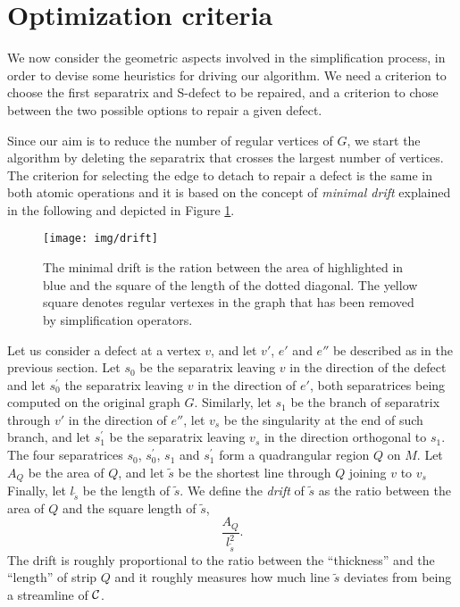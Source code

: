 \documentclass[11pt,a4paper]{article}
\begin{document}
\section{Optimization criteria}
\label{sec:optimize}
We now consider the geometric aspects involved in the simplification process, in order to devise some heuristics for driving our algorithm.
We need a criterion to choose the first separatrix and S-defect to be repaired, and a criterion to chose between the two possible options to repair a given defect.

Since our aim is to reduce the number of regular vertices of $G$, we start the algorithm by deleting the separatrix that crosses the largest number of vertices. 
The criterion for selecting the edge to detach to repair a defect is the same in both atomic operations and it is based on the concept of \emph{minimal drift} explained in the following and depicted in Figure \ref{fig:drift}. 

\begin{figure}
\centering
\mbox{}
\hfill
\centerline{\texttt{[image: img/drift]}}


\hfill\mbox{}
\caption{\label{fig:drift} The minimal drift is the ration between the area of highlighted in blue and the square of the length of the dotted diagonal. The yellow square denotes regular vertexes in the graph that has been removed by simplification operators.
}
\end{figure}


Let us consider a defect at a vertex $v$, and let $v'$, $e'$ and $e''$ be described as in the previous section.
Let $s_0$ be the separatrix leaving $v$ in the direction of the defect and let $s_0^{\prime}$ the separatrix leaving $v$ in the direction of $e'$, both separatrices being computed on the original graph $G$.
Similarly, let  $s_1$ be the branch of separatrix through $v'$ in the direction of $e''$, let $v_s$ be the singularity at the end of such branch, and let $s_1^{\prime}$ be the separatrix leaving $v_s$ in the direction orthogonal to $s_1$.
The four separatrices $s_0$,   $s_0^{\prime}$, $s_1$ and $s_1^{\prime}$ form a quadrangular region $Q$ on $M$.
Let $A_Q$ be the area of $Q$, and let $\tilde{s}$ be the shortest line through $Q$ joining $v$ to $v_s$
Finally, let $l_{\tilde{s}}$ be the length of $\tilde{s}$.
We define the {\em drift} of $\tilde{s}$ as the ratio between the area of $Q$ and the square length of $\tilde{s}$,
$$\frac{A_Q}{l_{\tilde{s}}^2}.$$ 
The drift is roughly proportional to the ratio between the ``thickness'' and the ``length'' of strip $Q$ and it roughly measures how much line $\tilde{s}$ deviates from being a streamline of $\cal C$. 
\end{document}
